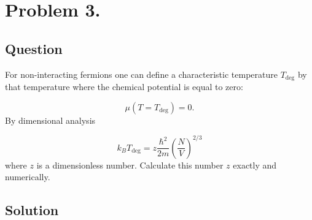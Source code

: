 \section*{Problem 3.}
\subsection*{Question}
For non-interacting fermions one can define a characteristic temperature $T_{\text{deg}}$ by that temperature where the chemical potential is equal to zero:

\begin{equation}
\mu \left( T = T_{\text{deg}} \right) = 0.
\end{equation}
By dimensional analysis

\begin{equation}
k_{B} T_{\text{deg}}
=
z \frac{\hbar^{2}}{2m} \left( \frac{N}{V} \right)^{2/3}
\end{equation}
where $z$ is a dimensionless number. Calculate this number $z$ exactly and numerically.

\subsection*{Solution}
